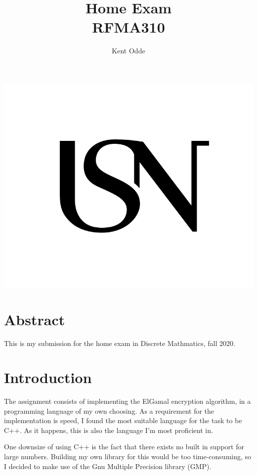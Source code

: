 \documentclass{article}
\begin{document}
\author{Kent Odde}
\title{Home Exam\\RFMA310}

\maketitle
\thispagestyle{empty}
\begin{center}
\includegraphics[width=\linewidth,height=0.2\textheight,keepaspectratio]{img/USN.png}
\end{center}
\newpage

\tableofcontents

\newpage

\section{Abstract}
This is my submission for the home exam in Discrete Mathmatics, fall 2020.

\section{Introduction}
The assignment consists of implementing the ElGamal encryption algorithm, in a programming language of my own choosing. As a requirement for the implementation is speed, I found the most suitable language for the task to be C++. As it happens, this is also the language I'm most proficient in.

One downsize of using C++ is the fact that there exists no built in support for large numbers. Building my own library for this would be too time-consuming, so I decided to make use of the Gnu Multiple Precision library (GMP)\cite{GMP}.
\end{document}
